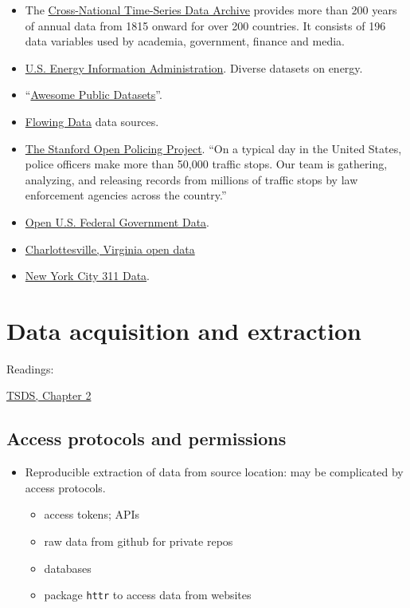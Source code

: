 \documentclass[
]{book}
\providecommand{\tightlist}{%
  \setlength{\itemsep}{0pt}\setlength{\parskip}{0pt}}
\begin{document}
\begin{itemize}
\tightlist
\item
  The \href{https://data.library.virginia.edu/datasources/licensed/cnts/}{Cross-National Time-Series Data Archive} provides more than 200 years of annual data from 1815 onward for over 200 countries. It consists of 196 data variables used by academia, government, finance and media.
\item
  \href{https://www.eia.gov/tools/}{U.S. Energy Information Administration}. Diverse datasets on energy.
\item
  ``\href{https://github.com/awesomedata/awesome-public-datasets}{Awesome Public Datasets}''.
\item
  \href{https://flowingdata.com/category/statistics/data-sources/}{Flowing Data} data sources.
\item
  \href{https://openpolicing.stanford.edu/}{The Stanford Open Policing Project}. ``On a typical day in the United States, police officers make more than 50,000 traffic stops. Our team is gathering, analyzing, and releasing records from millions of traffic stops by law enforcement agencies across the country.''
\item
  \href{https://www.data.gov/opendata/}{Open U.S. Federal Government Data}.
\item
  \href{https://opendata.charlottesville.org/}{Charlottesville, Virginia open data}
\item
  \href{https://portal.311.nyc.gov/article/?kanumber=KA-02893}{New York City 311 Data}.
\end{itemize}

\hypertarget{data-acquisition-and-extraction}{%
\chapter{Data acquisition and extraction}\label{data-acquisition-and-extraction}}

Readings:

\href{https://jhudatascience.org/tidyversecourse/get-data.html}{TSDS, Chapter 2}

\hypertarget{access-protocols-and-permissions}{%
\section{Access protocols and permissions}\label{access-protocols-and-permissions}}

\begin{itemize}
\item
  Reproducible extraction of data from source location: may be complicated by access protocols.

  \begin{itemize}
  \tightlist
  \item
    access tokens; APIs
  \item
    raw data from github for private repos
  \item
    databases
  \item
    package \texttt{httr} to access data from websites
  \end{itemize}
\end{itemize}
\end{document}
